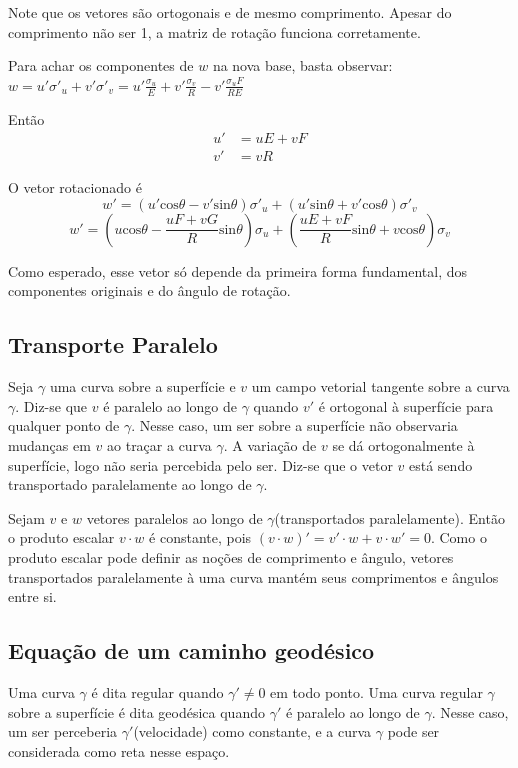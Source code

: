 Note que os vetores são ortogonais e de mesmo comprimento.
Apesar do comprimento não ser 1, a matriz de rotação funciona corretamente.

Para achar os componentes de $w$ na nova base, basta observar:
$w = u'\sigma'_u+v'\sigma'_v = u'\frac{\sigma_u}{E} + v'\frac{\sigma_v}{R}-v'\frac{\sigma_uF}{RE}$

Então
\begin{align*}
    u' &= uE + vF\\
    v' &= vR
\end{align*}

O vetor rotacionado é
\[w' = \left(u'\text{cos}\theta-v'\text{sin}\theta\right)\sigma'_u + \left(u'\text{sin}\theta+v'\text{cos}\theta\right)\sigma'_v\]
\[w' = \left(u\text{cos}\theta-\frac{uF+vG}{R}\text{sin}\theta\right)\sigma_u+\left(\frac{uE+vF}{R}\text{sin}\theta+v\text{cos}\theta\right)\sigma_v\]

Como esperado, esse vetor só depende da primeira forma fundamental,
dos componentes originais e do ângulo de rotação.

\subsection{Transporte Paralelo}
Seja $\gamma$ uma curva sobre a superfície e $v$ um campo vetorial tangente sobre a curva $\gamma$.
Diz-se que $v$ é paralelo ao longo de $\gamma$ quando $v'$ é ortogonal à superfície
para qualquer ponto de $\gamma$.
Nesse caso, um ser sobre a superfície não observaria mudanças em $v$ ao traçar a curva $\gamma$.
A variação de $v$ se dá ortogonalmente à superfície, logo não seria percebida pelo ser.
Diz-se que o vetor $v$ está sendo transportado paralelamente ao longo de $\gamma$.

Sejam $v$ e $w$ vetores paralelos ao longo de $\gamma$(transportados paralelamente).
Então o produto escalar $v \cdot w$ é constante, pois $(v \cdot w)' = v' \cdot w + v \cdot w' = 0$.
Como o produto escalar pode definir as noções de comprimento e ângulo, vetores transportados
paralelamente à uma curva mantém seus comprimentos e ângulos entre si.

\subsection{Equação de um caminho geodésico}
Uma curva $\gamma$ é dita regular quando $\gamma' \neq 0$ em todo ponto.
Uma curva regular $\gamma$ sobre a superfície é dita geodésica quando
$\gamma'$ é paralelo ao longo de $\gamma$.
Nesse caso, um ser perceberia $\gamma'$(velocidade) como constante, e a curva $\gamma$ pode
ser considerada como reta nesse espaço.


